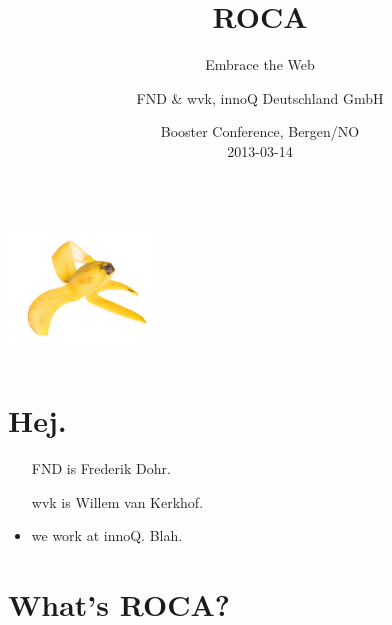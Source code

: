 \documentclass{beamer}
\date{Booster Conference, Bergen/NO \\ 2013-03-14}
\author{FND \& wvk, innoQ Deutschland GmbH}
\title{ROCA}
\subtitle{Embrace the Web}
\begin{document}
  {

  \begin{frame}[plain]
    \titlepage
  \end{frame}
}

\setcounter{tocdepth}{1}

\begin{frame}
  \begin{columns}
    \begin{column}{4.4cm}
      \includegraphics[width=4cm]{images/banana.jpg}
    \end{column}

    \begin{column}{6.6cm}
      \tableofcontents
    \end{column}
  \end{columns}
\end{frame}

\section{Hej.}

\begin{frame}{\insertsectionhead}
  \begin{itemize}
    \item[FND] is Frederik Dohr.
    \item[wvk] is Willem van Kerkhof.
    \item we work at innoQ. Blah.
  \end{itemize}

\end{frame}

\section{What's ROCA?}
\end{document}
